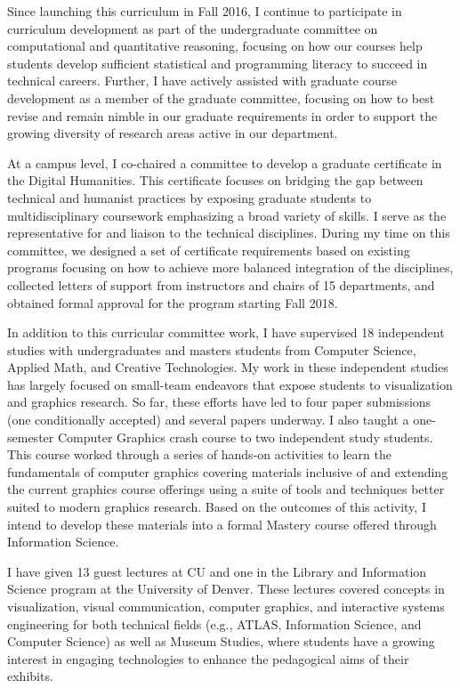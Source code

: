 \documentclass[11pt]{article}
\begin{document}
Since launching this curriculum in Fall 2016, I continue to participate in curriculum development as part of the undergraduate committee on computational and quantitative reasoning, focusing on how our courses help students develop sufficient statistical and programming literacy to succeed in technical careers. Further, I have actively assisted with graduate course development as a member of the graduate committee, focusing on how to best revise and remain nimble in our graduate requirements in order to support the growing diversity of research areas active in our department. 

At a campus level, I co-chaired a committee to develop a graduate certificate in the Digital Humanities. This certificate focuses on bridging the gap between technical and humanist practices by exposing graduate students to multidisciplinary coursework emphasizing a broad variety of skills. I serve as the representative for and liaison to the technical disciplines. During my time on this committee, we designed a set of certificate requirements based on existing programs focusing on how to achieve more balanced integration of the disciplines, collected letters of support from instructors and chairs of 15 departments, and obtained formal approval for the program starting Fall 2018. 

In addition to this curricular committee work, I have supervised 18 independent studies with undergraduates and masters students from Computer Science, Applied Math, and Creative Technologies. My work in these independent studies has largely focused on small-team endeavors that expose students to visualization and graphics research. So far, these efforts have led to four paper submissions (one conditionally accepted) and several papers underway. I also taught a one-semester Computer Graphics crash course to two independent study students. This course worked through a series of hands-on activities to learn the fundamentals of computer graphics covering materials inclusive of and extending the current graphics course offerings using a suite of tools and techniques better suited to modern graphics research. Based on the outcomes of this activity, I intend to develop these materials into a formal Mastery course offered through Information Science. 



I have given 13 guest lectures at CU and one in the Library and Information Science program at the University of Denver. These lectures covered concepts in visualization, visual communication, computer graphics, and interactive systems engineering for both technical fields (e.g., ATLAS, Information Science, and Computer Science) as well as Museum Studies, where students have a growing interest in engaging technologies to enhance the pedagogical aims of their exhibits. 
\end{document}
